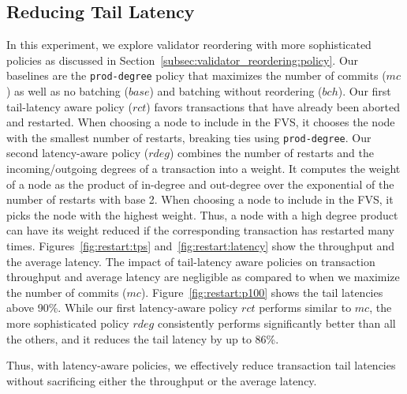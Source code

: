 \subsection{Reducing Tail Latency}

In this experiment, we explore validator reordering with more sophisticated policies as discussed in Section~\ref{subsec:validator_reordering:policy}.
Our baselines are the \texttt{prod-degree} policy that maximizes the number of commits ($mc$) as well as no batching ($base$) and batching without reordering ($bch$). 
Our first tail-latency aware policy ($rct$) favors transactions that have already been aborted and restarted. When choosing a node to include in the FVS, it chooses the node with the smallest number of restarts, breaking ties using \texttt{prod-degree}.
Our second latency-aware policy ($rdeg$) combines the number of restarts and the incoming/outgoing degrees of a transaction into a weight. It computes the weight of a node as
the product of in-degree and out-degree over the exponential of the number of
restarts with base 2. When choosing a node to include in the FVS, it picks the node with the highest weight. Thus, a node with a high degree product can have its weight reduced if the corresponding transaction has restarted many times.
Figures~\ref{fig:restart:tps} and~\ref{fig:restart:latency} show the throughput
and the average latency. The impact of tail-latency aware policies on transaction throughput and average latency are negligible as compared to when we maximize the number of commits ($mc$).
Figure~\ref{fig:restart:p100} shows the 
tail latencies above 90\%. 
While our first latency-aware policy $rct$ performs similar to $mc$, the more sophisticated policy $rdeg$ consistently performs significantly better than all the others, and it reduces the tail latency by up to 86\%.

Thus, with latency-aware policies, we effectively reduce transaction tail latencies without sacrificing either the throughput or the average latency.

